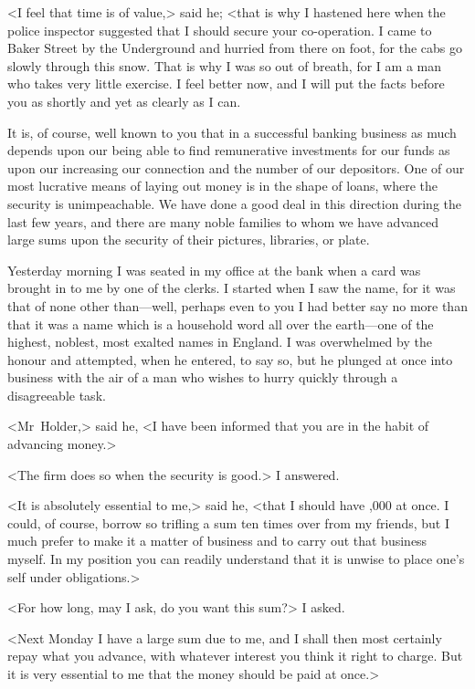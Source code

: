 <I feel that time is of value,> said he; <that is why I hastened here when the police inspector suggested that I should secure your co-operation. I came to Baker Street by the Underground and hurried from there on foot, for the cabs go slowly through this snow. That is why I was so out of breath, for I am a man who takes very little exercise. I feel better now, and I will put the facts before you as shortly and yet as clearly as I can.

It is, of course, well known to you that in a successful banking business as much depends upon our being able to find remunerative investments for our funds as upon our increasing our connection and the number of our depositors. One of our most lucrative means of laying out money is in the shape of loans, where the security is unimpeachable. We have done a good deal in this direction during the last few years, and there are many noble families to whom we have advanced large sums upon the security of their pictures, libraries, or plate.

Yesterday morning I was seated in my office at the bank when a card was brought in to me by one of the clerks. I started when I saw the name, for it was that of none other than—well, perhaps even to you I had better say no more than that it was a name which is a household word all over the earth—one of the highest, noblest, most exalted names in England. I was overwhelmed by the honour and attempted, when he entered, to say so, but he plunged at once into business with the air of a man who wishes to hurry quickly through a disagreeable task.

<Mr~Holder,> said he, <I have been informed that you are in the habit of advancing money.>

<The firm does so when the security is good.> I answered.

<It is absolutely essential to me,> said he, <that I should have ,000 at once. I could, of course, borrow so trifling a sum ten times over from my friends, but I much prefer to make it a matter of business and to carry out that business myself. In my position you can readily understand that it is unwise to place one's self under obligations.>

<For how long, may I ask, do you want this sum?> I asked.

<Next Monday I have a large sum due to me, and I shall then most certainly repay what you advance, with whatever interest you think it right to charge. But it is very essential to me that the money should be paid at once.>

